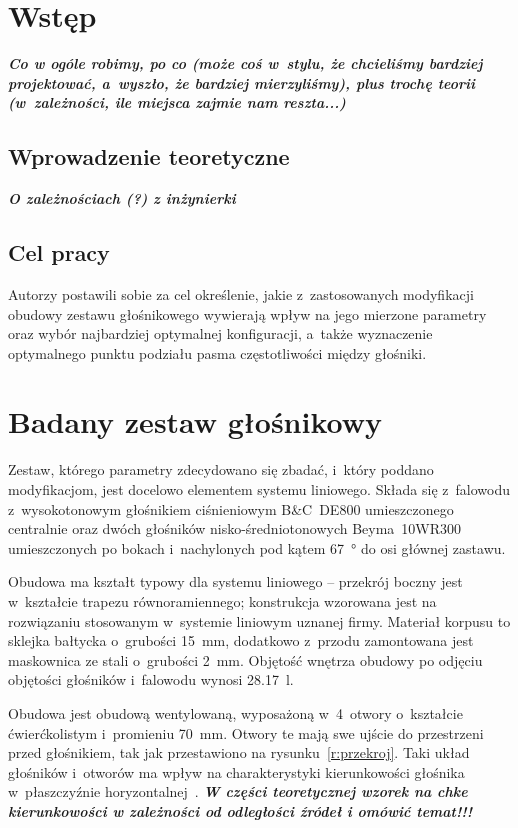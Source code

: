 \documentclass[12pt]{oska}
\affiliation{Akademia Górniczo-Hutnicza im. S. Staszica w Krakowie}
\newcommand{\comment}[1]{{\color{magenta}\emph{\textbf{#1}}}}
\begin{document}
\maketitles

\section{Wstęp}

	\comment{Co w ogóle robimy, po co (może coś w~stylu, że chcieliśmy bardziej projektować, a~wyszło, że bardziej mierzyliśmy), plus trochę teorii (w~zależności, ile miejsca zajmie nam reszta...)}
	
	\subsection{Wprowadzenie teoretyczne}
	
	\comment{O zależnościach (?) z inżynierki}
	
	\subsection{Cel pracy}
	
		Autorzy postawili sobie za cel określenie, jakie z~zastosowanych modyfikacji obudowy zestawu głośnikowego wywierają wpływ na jego mierzone parametry oraz wybór najbardziej optymalnej konfiguracji, a~także wyznaczenie optymalnego punktu podziału pasma częstotliwości między głośniki.

\section{Badany zestaw głośnikowy}
	
	Zestaw, którego parametry zdecydowano się zbadać, i~który poddano modyfikacjom, jest docelowo elementem systemu liniowego. Składa się z~falowodu z~wysokotonowym głośnikiem ciśnieniowym B\&C~DE800 umieszczonego centralnie oraz dwóch głośników nisko-średniotonowych Beyma~10WR300 umieszczonych po bokach i~nachylonych pod kątem \SI{67}{\degree} do osi głównej zastawu. 
	
	Obudowa ma kształt typowy dla systemu liniowego -- przekrój boczny jest w~kształcie trapezu równoramiennego; konstrukcja wzorowana jest na rozwiązaniu stosowanym w~systemie liniowym uznanej firmy. Materiał korpusu to sklejka bałtycka o~grubości \SI{15}{\milli\metre}, dodatkowo z~przodu zamontowana jest maskownica ze stali o~grubości \SI{2}{\milli\metre}. Objętość wnętrza obudowy po odjęciu objętości głośników i~falowodu wynosi \SI{28,17}{\litre}.
	
	Obudowa jest obudową wentylowaną, wyposażoną w~4~otwory o~kształcie ćwierćkolistym i~promieniu \SI{70}{\milli\metre}. Otwory te mają swe ujście do przestrzeni przed głośnikiem, tak jak przestawiono na rysunku~\ref{r:przekroj}. %
	Taki układ głośników i~otworów ma wpływ na charakterystyki kierunkowości głośnika w~płaszczyźnie horyzontalnej~\cite{kmiecik_inz}. \comment{W części teoretycznej wzorek na chke kierunkowości w zależności od odległości źródeł i omówić temat!!!}
	
\end{document}
